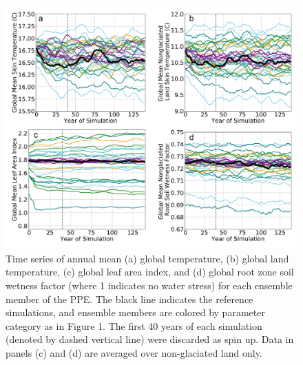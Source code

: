 \documentclass[draft, grl]{agujournal2019}
\begin{document}
\begin{figure}[htb!]
\noindent\includegraphics[width=\textwidth]{writing/figs/Figure_S_SpinUp.pdf}
\caption{Time series of annual mean (a) global temperature, (b) global land temperature, (c) global leaf area index, and (d) global root zone soil wetness factor (where 1 indicates no water stress) for each ensemble member of the PPE. The black line indicates the reference simulations, and ensemble members are colored by parameter category as in Figure 1. The first 40 years of each simulation (denoted by dashed vertical line) were discarded as spin up. Data in panels (c) and (d) are averaged over non-glaciated land only.}
\label{fig:supp_spinup}
\end{figure}


\end{document}
